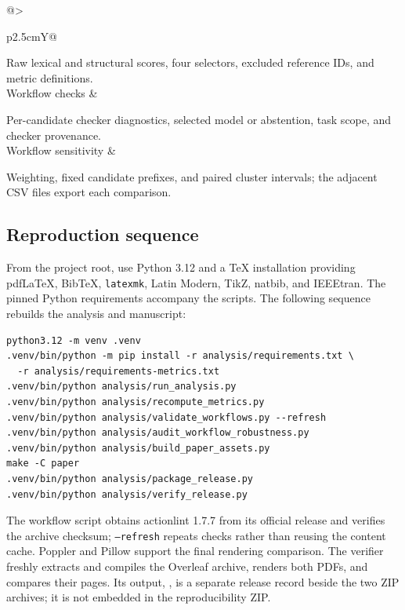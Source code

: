 \begin{table}[H]
\begin{tabularx}{\linewidth}{@{}>{\raggedright\arraybackslash}p{2.5cm}Y@{}}
Raw lexical and structural scores, four selectors, excluded reference IDs, and metric definitions.\\
Workflow checks & \par
{}\par
{}\par
{}\par
Per-candidate checker diagnostics, selected model or abstention, task scope, and checker provenance.\\
Workflow sensitivity & \par
{}\par
Weighting, fixed candidate prefixes, and paired cluster intervals; the adjacent CSV files export each comparison.\\
\bottomrule
\end{tabularx}
\end{table}

\clearpage
\subsection{Reproduction sequence}
From the project root, use Python 3.12 and a TeX installation providing pdfLaTeX, BibTeX, \texttt{latexmk}, Latin Modern, TikZ, natbib, and IEEEtran. The pinned Python requirements accompany the scripts. The following sequence rebuilds the analysis and manuscript:
\begin{lstlisting}[basicstyle=\ttfamily\footnotesize]
python3.12 -m venv .venv
.venv/bin/python -m pip install -r analysis/requirements.txt \
  -r analysis/requirements-metrics.txt
.venv/bin/python analysis/run_analysis.py
.venv/bin/python analysis/recompute_metrics.py
.venv/bin/python analysis/validate_workflows.py --refresh
.venv/bin/python analysis/audit_workflow_robustness.py
.venv/bin/python analysis/build_paper_assets.py
make -C paper
.venv/bin/python analysis/package_release.py
.venv/bin/python analysis/verify_release.py
\end{lstlisting}
The workflow script obtains actionlint 1.7.7 from its official release and verifies the archive checksum; \texttt{--refresh} repeats checks rather than reusing the content cache. Poppler and Pillow support the final rendering comparison. The verifier freshly extracts and compiles the Overleaf archive, renders both PDFs, and compares their pages. Its output, , is a separate release record beside the two ZIP archives; it is not embedded in the reproducibility ZIP.


